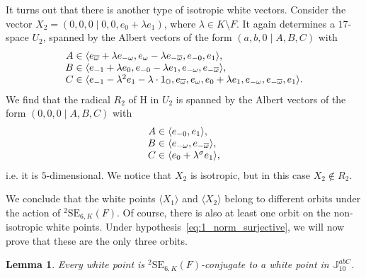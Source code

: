 \documentclass{amsart}
\def\OO{\mathord{\mathbb{O}}}
\newcommand{\SE}{\mathrm{SE}}
\newcommand{\J}{\mathbb{J}}
\renewcommand{\bar}{\overline}
\renewcommand{\H}{\mathrm{H}}
\newcommand{\s}{\sigma}
\theoremstyle{plain}
\numberwithin{theorem}{section}
\newtheorem{lemma}[theorem]{Lemma}
\theoremstyle{definition}
\begin{document}
It turns out that there is another type of isotropic white vectors. Consider the vector
$X_2 = (0,0,0 \mid 0,0,e_0 + \lambda e_1)$, where $\lambda \in K\setminus F$. It again determines a 
$17$-space $U_2$, spanned by the Albert vectors of the form $(a,b,0\mid A,B,C)$ with 
\begin{equation}
	\label{eq:U2}
	\begin{array}{r@{\;}c@{\;}l}
		A & \in & \langle e_{\bar{\omega}}+\lambda e_{-\omega}, e_{\omega}-\lambda e_{-\bar{\omega}}
		, e_{-0}, e_1
		\rangle, \\
		B & \in & \langle e_{-1}+\lambda e_0, e_{-0} - \lambda e_1,
	e_{-\omega}, e_{-\bar{\omega}}  \rangle, \\
		C & \in & \langle e_{-1}-\lambda^2 e_1 - \lambda \cdot 1_{\OO}, e_{\bar{\omega}}, e_{\omega},
	e_0 + \lambda e_1, e_{-\omega}, e_{-\bar{\omega}}, e_1 \rangle.
	\end{array}
\end{equation}
We find that the radical $R_2$ of $\H$ in $U_2$ is spanned by the Albert vectors of the form 
$(0,0,0\mid A,B,C)$ with 
\begin{equation}
	\label{eq:R2}
	\begin{array}{r@{\;}c@{\;}l}
		A & \in & \langle e_{-0}, e_1 \rangle, \\
		B & \in & \langle e_{-\omega}, e_{-\bar{\omega}} \rangle, \\
		C & \in & \langle e_0 + \lambda^{\s} e_1 \rangle,
	\end{array}
\end{equation}
i.e. it is $5$-dimensional. We notice that $X_2$ is isotropic, but in this case $X_2 \not\in R_2$.

We conclude that the white points $\langle X_1 \rangle$ and $\langle X_2 \rangle$ belong to different
orbits under the action of ${}^2\SE_{6,K}(F)$. Of course, there is also at least one orbit on the
non-isotropic white points. Under hypothesis~\eqref{eq:1_norm_surjective},
we will now prove that these are the only three orbits.

\begin{lemma}
\label{lemma:6_reduce_J10}
Every white point is $ {}^2\SE_{6,K}(F)$-conjugate to a white point in
$\J_{10}^{abC}$.
\end{lemma}
\end{document}
